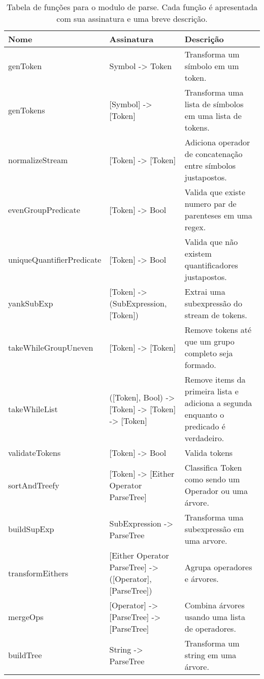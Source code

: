 \begin{table}
  \begin{tabular}{lll}
  \hline
  Nome & Assinatura & Descrição \\
  \hline
  genToken & Symbol -> Token & Transforma um símbolo em um token. \\
  genTokens & [Symbol] -> [Token] & Transforma uma lista de símbolos em uma lista de tokens. \\
  normalizeStream & [Token] -> [Token] & Adiciona operador de concatenação entre símbolos justapostos. \\
  evenGroupPredicate & [Token] -> Bool & Valida que existe numero par de parenteses em uma regex. \\
  uniqueQuantifierPredicate & [Token] -> Bool & Valida que não existem quantificadores justapostos. \\
  yankSubExp & [Token] -> (SubExpression, [Token]) & Extrai uma subexpressão do stream de tokens. \\
  takeWhileGroupUneven & [Token] -> [Token] & Remove tokens até que um grupo completo seja formado. \\
  takeWhileList & ([Token], Bool) -> [Token] -> [Token] -> [Token] & Remove items da primeira lista e adiciona a segunda enquanto o predicado é verdadeiro.\\
  validateTokens  & [Token] -> Bool & Valida tokens \\
  sortAndTreefy & [Token] -> [Either Operator ParseTree] & Classifica Token como sendo um Operador ou uma árvore. \\
  buildSupExp & SubExpression -> ParseTree & Transforma uma subexpressão em uma arvore. \\
  transformEithers & [Either Operator ParseTree] -> ([Operator], [ParseTree]) & Agrupa operadores e árvores. \\
  mergeOps & [Operator] -> [ParseTree] -> [ParseTree] & Combina árvores usando uma lista de operadores. \\
  buildTree & String -> ParseTree & Transforma um string em uma árvore. \\
 \hline
  \end{tabular}
\caption{Tabela de funções para o modulo de parse. Cada função é apresentada com sua assinatura e uma breve descrição.}
\label{t-parse-funcs}
\end{table}
